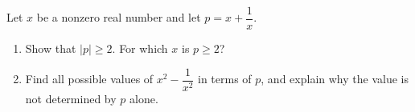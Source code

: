 Let $x$ be a nonzero real number and let $p=x+\dfrac{1}{x}$.
\begin{enumerate}
\item[(a)] Show that $|p|\ge2$. For which $x$ is $p\ge2$?
\item[(b)] Find all possible values of $x^2-\dfrac{1}{x^2}$ in terms of $p$, and explain why the value is not determined by $p$ alone.
\end{enumerate}
